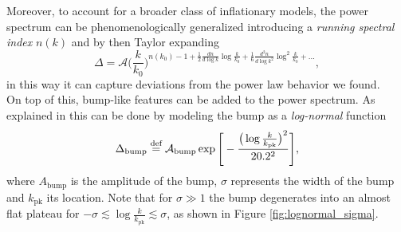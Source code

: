 Moreover, to account for a broader class of inflationary models, the power spectrum can be phenomenologically generalized introducing a \emph{running spectral index} $n(k)$ and by then Taylor expanding
\begin{equation}
    \Delta=\mathcal{A}\bigg(\frac{k}{k_0}\bigg)^{n(k_0)-1+\frac{1}{2}\frac{d n}{d\log k}\log\frac{k}{k_0}+\frac{1}{6}\frac{d^2 n}{d\log k^2}\log^2\frac{k}{k_0}+\dots},
\end{equation}
in this way it can capture deviations from the power law behavior we found.\\
On top of this, bump-like features can be added to the power spectrum. As explained in \cite{Hamann_2022} this can be done by modeling the bump as a \emph{log-normal} function
\begin{equation}
    \Delta_\text{bump}\stackrel{\text{def}}{=} \mathcal A_\text{bump}\exp\Bigg[-\frac{\big(\log\frac{k}{k_{\text{pk}}}\big)^2}{20.2^2}\Bigg],\label{eq:lognormal}
\end{equation}
where $A_\text{bump}$ is the amplitude of the bump, $\sigma$ represents the width of the bump and $k_\text{pk}$ its location.  Note that for $\sigma\gg 1$ the bump degenerates into an almost flat plateau for $-\sigma\lesssim \log\frac{k}{k_{\text{pk}}}\lesssim\sigma $, as shown in Figure \ref{fig:lognormal_sigma}.
